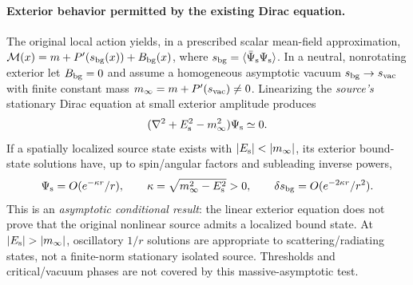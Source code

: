 \documentclass[11pt,a4paper]{article}
\begin{document}
\paragraph{Exterior behavior permitted by the existing Dirac equation.}
The original local action yields, in a prescribed scalar mean-field approximation, $\mathcal M(x)=m+P'(s_{\rm bg}(x))+B_{\rm bg}(x)$, where $s_{\rm bg}=\langle\bar\Psi_{\rm s}\Psi_{\rm s}\rangle$. In a neutral, nonrotating exterior let $B_{\rm bg}=0$ and assume a homogeneous asymptotic vacuum $s_{\rm bg}\to s_{\rm vac}$ with finite constant mass $m_\infty=m+P'(s_{\rm vac})\ne0$. Linearizing the \emph{source's} stationary Dirac equation at small exterior amplitude produces
\begin{equation}\label{eq:qgd013-helmholtz}
 (\nabla^2+E_{\rm s}^2-m_\infty^2)\Psi_{\rm s}\simeq0.
\end{equation}
If a spatially localized source state exists with $|E_{\rm s}|<|m_\infty|$, its exterior bound-state solutions have, up to spin/angular factors and subleading inverse powers,
\begin{equation}\label{eq:qgd013-source-tail}
 \Psi_{\rm s}=O(e^{-\kappa r}/r),\qquad
 \kappa=\sqrt{m_\infty^2-E_{\rm s}^2}>0,\qquad
 \delta s_{\rm bg}=O(e^{-2\kappa r}/r^2).
\end{equation}
This is an \emph{asymptotic conditional result}: the linear exterior equation does not prove that the original nonlinear source admits a localized bound state. At $|E_{\rm s}|>|m_\infty|$, oscillatory $1/r$ solutions are appropriate to scattering/radiating states, not a finite-norm stationary isolated source. Thresholds and critical/vacuum phases are not covered by this massive-asymptotic test.
\end{document}
